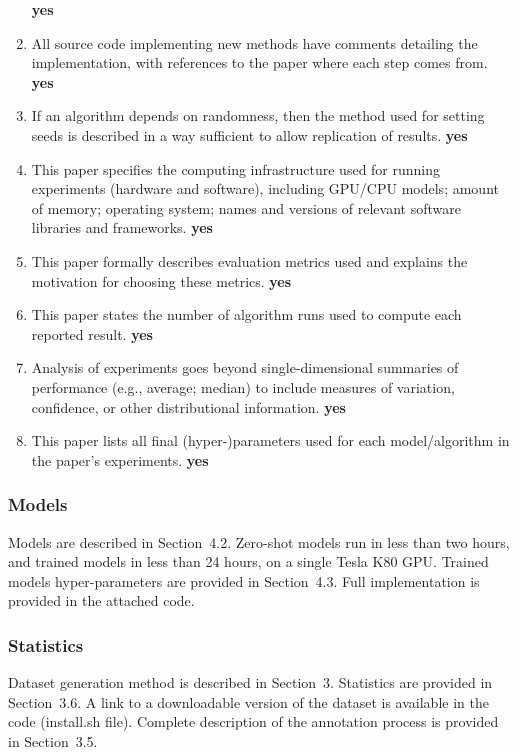 \documentclass[letterpaper]{article} \usepackage{aaai23}  \usepackage{times}  \usepackage{helvet}  \usepackage{courier}  \usepackage[hyphens]{url}  \usepackage{graphicx} \urlstyle{rm} \def\UrlFont{\rm}  \usepackage{natbib}  \usepackage{caption} \frenchspacing  \setlength{\pdfpagewidth}{8.5in}  \setlength{\pdfpageheight}{11in}  \usepackage{algorithm}
\begin{document}
\begin{enumerate}
    \textbf{yes}
    \item All source code implementing new methods have comments detailing the implementation, with references to the paper where each step comes from.
    \textbf{yes}
    \item If an algorithm depends on randomness, then the method used for setting seeds is described in a way sufficient to allow replication of results.
    \textbf{yes}
    \item This paper specifies the computing infrastructure used for running experiments (hardware and software), including GPU/CPU models; amount of memory; operating system; names and versions of relevant software libraries and frameworks.
    \textbf{yes}
    \item This paper formally describes evaluation metrics used and explains the motivation for choosing these metrics.
    \textbf{yes}
    \item This paper states the number of algorithm runs used to compute each reported result.
    \textbf{yes}
    \item Analysis of experiments goes beyond single-dimensional summaries of performance (e.g., average; median) to include measures of variation, confidence, or other distributional information.
    \textbf{yes}
    \item This paper lists all final (hyper-)parameters used for each model/algorithm in the paper’s experiments.
    \textbf{yes}


\end{enumerate}

\subsubsection{Models}
Models are described in Section~4.2. Zero-shot models run in less than two hours, and trained models in less than 24 hours, on a single Tesla K80 GPU. 
Trained models hyper-parameters are provided in Section~4.3. Full implementation is provided in the attached code. 

\subsubsection{Statistics}
Dataset generation method is described in Section~3. Statistics are provided in Section~3.6. A link to a downloadable version of the dataset is available in the code (install.sh file). Complete description of the annotation process is provided in Section~3.5. 
\end{document}
